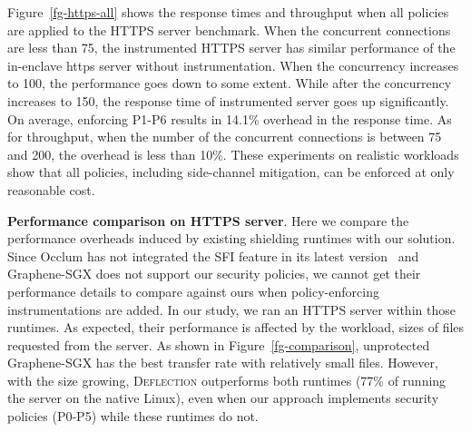 Figure~\ref{fg-https-all} shows the response times and throughput when all policies are applied to the HTTPS server benchmark. When the concurrent connections are less than 75, the instrumented HTTPS server has similar performance of the in-enclave https server without instrumentation. When the concurrency increases to 100, the performance goes down to some extent. 
While after the concurrency increases to 150, the response time of instrumented server goes up significantly. On average, enforcing P1-P6 results in 14.1\% overhead in the response time. As for throughput, when the number of the concurrent connections is between 75 and 200, the overhead is less than 10\%. 
These experiments on realistic workloads show that all policies, including side-channel mitigation, can be enforced at only reasonable cost. 


\vspace{3pt}\noindent\textbf{Performance comparison on HTTPS server}.
Here we compare the performance overheads induced by existing shielding runtimes with our solution. Since Occlum has not integrated the SFI feature in its latest version~\cite{occlum} and Graphene-SGX does not support our security policies, we cannot get their performance details to compare against ours when policy-enforcing instrumentations are added. In our study, we ran an HTTPS server within those runtimes. As expected, their performance is affected by the workload, sizes of files requested from the server. As shown in Figure~\ref{fg-comparison}, unprotected Graphene-SGX has the best transfer rate with relatively small files. However, with the size growing, \textsc{Deflection} outperforms both runtimes (77\% of running the server on the native Linux), even when our approach implements security policies (P0-P5) while these runtimes do not. 




